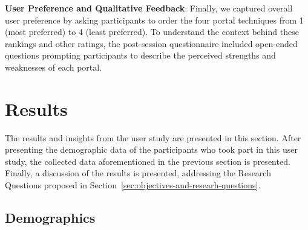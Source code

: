 \textbf{User Preference and Qualitative Feedback}: Finally, we captured overall user preference by asking participants to order the four portal techniques from 1 (most preferred) to 4 (least preferred). To understand the context behind these rankings and other ratings, the post-session questionnaire included open-ended questions prompting participants to describe the perceived strengths and weaknesses of each portal.







\section{Results}
\label{sec:results}

The results and insights from the user study are presented in this section. After presenting the demographic data of the participants who 
took part in this user study, the collected data aforementioned in the previous section is presented. Finally, a discussion of the 
results is presented, addressing the Research Questions proposed in Section~\ref{sec:objectives-and-researh-questions}.

\subsection{Demographics}
\label{sec:demographics}

